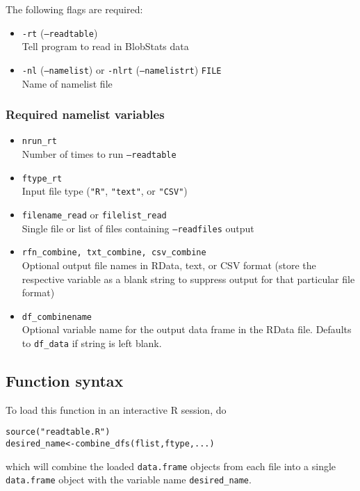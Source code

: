 \documentclass{article}
\begin{document}
The following flags are required:
\begin{itemize}
\item[] \texttt{-rt} (\texttt{--readtable}) \\ Tell program to read in BlobStats data
\item[]\texttt{-nl} (\texttt{--namelist}) or \texttt{-nlrt} (\texttt{--namelistrt}) \texttt{FILE}\\ Name of namelist file
\end{itemize}

\subsubsection{Required namelist variables}

\begin{itemize}
\item[] \texttt{nrun\_rt}\\ Number of times to run \texttt{--readtable}
\item[] \texttt{ftype\_rt}\\ Input file type (\texttt{"R"}, \texttt{"text"}, or \texttt{"CSV"})
\item[] \texttt{filename\_read} or \texttt{filelist\_read}\\ Single file or list of files containing \texttt{--readfiles} output
\item[] \texttt{rfn\_combine, txt\_combine, csv\_combine}\\Optional output file names in RData, text, or CSV format (store the respective variable as a blank string to suppress output for that particular file format)
\item[] \texttt{df\_combinename}\\Optional variable name for the output data frame in the RData file. Defaults to \texttt{df\_data} if string is left blank.
\end{itemize}
\subsection{Function syntax}
To load this function in an interactive R session, do
\begin{verbatim}
source("readtable.R")
desired_name<-combine_dfs(flist,ftype,...)
\end{verbatim}

which will combine the loaded \texttt{data.frame} objects from each file into a single \texttt{data.frame} object with the variable name \texttt{desired\_name}.
\end{document}
